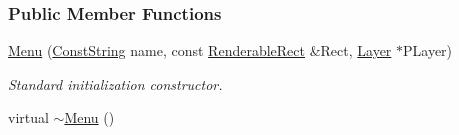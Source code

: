 \subsubsection*{Public Member Functions}
\begin{DoxyCompactItemize}
\item 
\hyperlink{classMezzanine_1_1UI_1_1Menu_a8f3d2f15d3b620eba00e2c5c713881f5}{Menu} (\hyperlink{namespaceMezzanine_a63cd699ac54b73953f35ec9cfc05e506}{ConstString} name, const \hyperlink{structMezzanine_1_1UI_1_1RenderableRect}{RenderableRect} \&Rect, \hyperlink{classMezzanine_1_1UI_1_1Layer}{Layer} $\ast$PLayer)
\begin{DoxyCompactList}\small\item\em Standard initialization constructor. \item\end{DoxyCompactList}\item 
\hypertarget{classMezzanine_1_1UI_1_1Menu_aeb847e055541acb9d531391ba66b8681}{
virtual \hyperlink{classMezzanine_1_1UI_1_1Menu_aeb847e055541acb9d531391ba66b8681}{$\sim$Menu} ()}
\label{classMezzanine_1_1UI_1_1Menu_aeb847e055541acb9d531391ba66b8681}


\end{DoxyCompactItemize}
